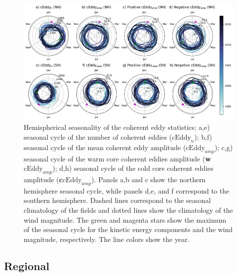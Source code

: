 \documentclass[draft,linenumbers]{agujournal2019}
\newcommand{\MEKE}{\overline{\textrm{EKE}}}
\newcommand{\EKE}{\textrm{EKE}}
\newcommand{\MCEKE}{\overline{\textrm{CEKE}}}
\newcommand{\CEKE}{\textrm{CEKE}}
\newcommand{\cEddy}{\textrm{cEddy}}
\begin{document}
	\begin{figure}
	    \centering
	    \includegraphics[width=1\textwidth]{figures/All_polar_plots_eddy_stats_polarity.pdf}
	    \caption{Hemispherical seasonality of the coherent eddy statistics;
		a,e) seasonal cycle of the number of coherent eddies ($\cEddy_n$); b,f) seasonal cycle of the mean coherent eddy amplitude ($\cEddy_{amp}$); c,g) seasonal cycle of the warm core coherent eddies amplitude (\textbf{w$\cEddy_{amp}$}); d,h) seasonal cycle of the cold core coherent eddies amplitude (\textbf{c$\cEddy_{amp}$}). Panels a,b and c show the northern hemisphere seasonal cycle, while panels d,e, and f correspond to the southern hemisphere. Dashed lines correspond to the seasonal climatology of the fields and dotted lines show the climatology of the wind magnitude. The green and magenta stars show the maximum of the seasonal cycle for the kinetic energy components and the wind magnitude, respectively. The line colors show the year.}
	    \label{fig:eddy_stats_polar}
	\end{figure}


	\subsection{Regional}
	
\end{document}
